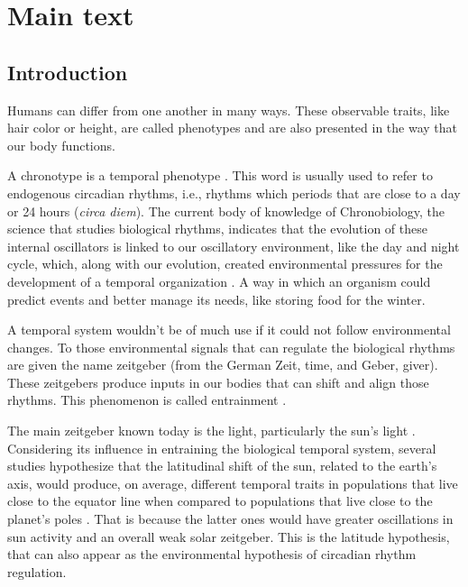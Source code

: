 \documentclass[
12pt,
openright,
oneside,
a4paper,
chapter=TITLE,
section=TITLE,
french,
spanish,
brazil,
english
]{abntex2}\usepackage{array}
\begin{document}
\section{Main text}\label{main-text}

\subsection{Introduction}\label{introduction-1}

Humans can differ from one another in many ways. These observable
traits, like hair color or height, are called phenotypes and are also
presented in the way that our body functions.

A chronotype is a temporal phenotype
\autocite{ehret1974,pittendrigh1993}. This word is usually used to refer
to endogenous circadian rhythms, i.e., rhythms which periods that are
close to a day or 24 hours (\emph{circa diem}). The current body of
knowledge of Chronobiology, the science that studies biological rhythms,
indicates that the evolution of these internal oscillators is linked to
our oscillatory environment, like the day and night cycle, which, along
with our evolution, created environmental pressures for the development
of a temporal organization \autocite{aschoff1989,paranjpe2005}. A way in
which an organism could predict events and better manage its needs, like
storing food for the winter.

A temporal system wouldn't be of much use if it could not follow
environmental changes. To those environmental signals that can regulate
the biological rhythms are given the name zeitgeber (from the German
Zeit, time, and Geber, giver). These zeitgebers produce inputs in our
bodies that can shift and align those rhythms. This phenomenon is called
entrainment \autocite{roenneberg2003a,roenneberg2010}.

The main zeitgeber known today is the light, particularly the sun's
light \autocite{khalsa2003,minors1991,roenneberg2007a}. Considering its
influence in entraining the biological temporal system, several studies
hypothesize that the latitudinal shift of the sun, related to the
earth's axis, would produce, on average, different temporal traits in
populations that live close to the equator line when compared to
populations that live close to the planet's poles
\autocite{horzum2015,hut2013,leocadio-miguel2017,leocadio-miguel2014,pittendrigh1991,randler2017}.
That is because the latter ones would have greater oscillations in sun
activity and an overall weak solar zeitgeber. This is the latitude
hypothesis, that can also appear as the environmental hypothesis of
circadian rhythm regulation.
\end{document}
